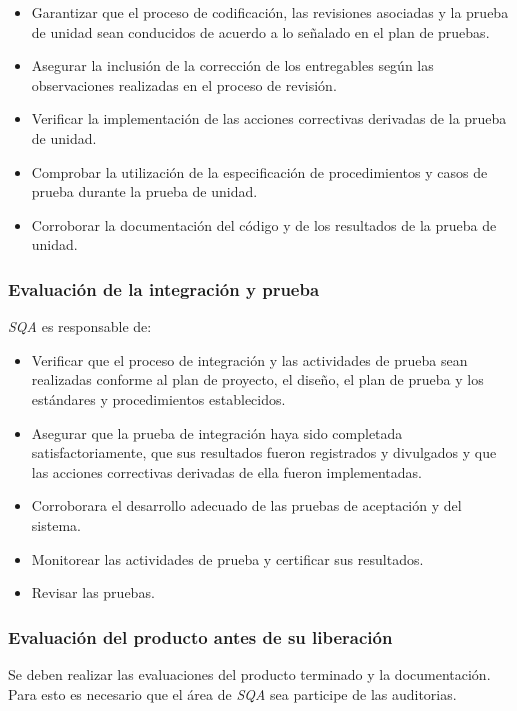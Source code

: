 	\begin{itemize}
		\item 
		Garantizar que el proceso de codificación, las revisiones asociadas y la prueba de unidad sean conducidos de acuerdo a lo señalado en el plan de pruebas.
		\item
		Asegurar la inclusión de la corrección de los entregables según las observaciones realizadas en el proceso de revisión.
		\item
		Verificar la implementación de las acciones correctivas derivadas de la prueba de unidad.
		\item
		Comprobar la utilización de la especificación de procedimientos y casos de prueba durante la prueba de unidad. 
		\item
		Corroborar la documentación del código y de los resultados de la prueba de unidad.
	\end{itemize}

\subsubsection{Evaluación de la integración y prueba}

\textit{SQA} es responsable de:

	\begin{itemize}
		\item 
		Verificar que el proceso de integración y las actividades de prueba sean realizadas conforme al plan de proyecto, el diseño, el plan de prueba y los estándares y procedimientos establecidos.
		\item
		Asegurar que la prueba de integración haya sido completada satisfactoriamente, que sus resultados fueron registrados y divulgados y que las acciones correctivas derivadas de ella fueron implementadas.
		\item	
		Corroborara el desarrollo adecuado de las pruebas de aceptación y del sistema.
		\item
		Monitorear las actividades de prueba y certificar sus resultados.
		\item
		Revisar las pruebas.
	\end{itemize}

\subsubsection{Evaluación del producto antes de su liberación}

Se deben realizar las evaluaciones del producto terminado y la documentación. Para esto es necesario que el área de \textit{SQA} sea participe de las auditorias.

